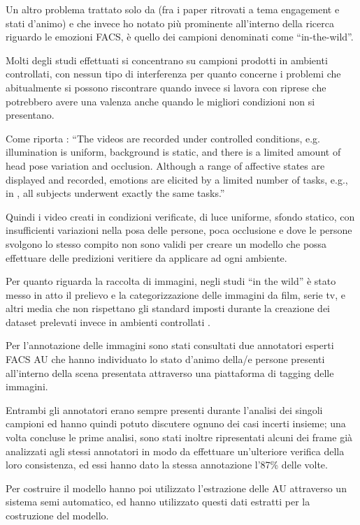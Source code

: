 Un altro problema trattato solo da \cite{PredLocStudEngagInTheWild} (fra i paper ritrovati a tema engagement e stati d’animo) e che invece ho notato più prominente all’interno della ricerca riguardo le emozioni FACS, è quello dei campioni denominati come “in-the-wild”.

Molti degli studi effettuati si concentrano su campioni prodotti in ambienti controllati, con nessun tipo di interferenza per quanto concerne i problemi che abitualmente si possono riscontrare quando invece si lavora con riprese che potrebbero avere una valenza anche quando le migliori condizioni non si presentano.

Come riporta \cite{AFEWVAdatabaseInTheWild}: “The videos are recorded under controlled conditions, e.g. illumination is uniform, background is static, and there is a limited amount of head pose variation and occlusion. Although a range of affective states are displayed and recorded, emotions are elicited by a limited number of tasks, e.g., in \cite{BelfastInducedNaturalEmotionDatabase}, all subjects underwent exactly the same tasks.”

Quindi i video creati in condizioni verificate, di luce uniforme, sfondo statico, con insufficienti variazioni nella posa delle persone, poca occlusione e dove le persone svolgono lo stesso compito non sono validi per creare un modello che possa effettuare delle predizioni veritiere da applicare ad ogni ambiente.

Per quanto riguarda la raccolta di immagini, negli studi “in the wild” è stato messo in atto il prelievo e la categorizzazione delle immagini da film, serie tv, e altri media che non rispettano gli standard imposti durante la creazione dei dataset prelevati invece in ambienti controllati \cite{AFEWVAdatabaseInTheWild}.

Per l’annotazione delle immagini sono stati consultati due annotatori esperti FACS AU che hanno individuato lo stato d’animo della/e persone presenti all’interno della scena presentata attraverso una piattaforma di tagging delle immagini.

Entrambi gli annotatori erano sempre presenti durante l’analisi dei singoli campioni ed hanno quindi potuto discutere ognuno dei casi incerti insieme; una volta concluse le prime analisi, sono stati inoltre ripresentati alcuni dei frame già analizzati agli stessi annotatori in modo da effettuare un’ulteriore verifica della loro consistenza, ed essi hanno dato la stessa annotazione l’87\% delle volte.

Per costruire il modello hanno poi utilizzato l’estrazione delle AU attraverso un sistema semi automatico, ed hanno utilizzato questi dati estratti per la costruzione del modello.


